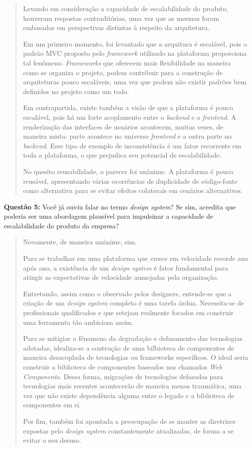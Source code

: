 \begin{quote}
    Levando em consideração a capacidade de escalabilidade do produto, houveram respostas contraditórias, uma vez que as mesmas foram embasadas em perspectivas distintas à respeito da arquitetura.
    
    Em um primeiro momento, foi levantado que a arquitura é escalável, pois o padrão MVC proposto pelo \textit{framework} utilizado na plataforma proporciona tal fenômeno. \textit{Frameworks} que oferecem mais flexibilidade na maneira como se organiza o projeto, podem contribuir para a construção de arquiteturas pouco escaláveis, uma vez que podem não existir padrões bem definidos no projeto como um todo.
    
    Em contrapartida, existe também a visão de que a plataforma é pouco escalável, pois há um forte acoplamento entre o \textit{backend} e o \textit{frontend}. A renderização das interfaces de usuários acontecem, muitas vezes, de maneira mista: parte acontece no universo \textit{frontend} e a outra parte no \textit{backend}. Esse tipo de exemplo de inconsistência é um fator recorrente em toda a plataforma, o que prejudica seu potencial de escalabilidade.
    
    No quesito reusabilidade, o parecer foi unânime. A plataforma é pouco reusável, apresentando várias ocorrências de duplicidade de código-fonte como alternativa para se evitar efeitos colaterais em cenários alternativos.
\end{quote}

\textbf{Questão 5:} Você já ouviu falar no termo \textit{design system}? Se sim, acredita que poderia ser uma abordagem plausível para impulsinar a capacidade de escalabilidade do produto da empresa?

\begin{quote}
    Novamente, de maneira unânime, sim.

    Para se trabalhar em uma plataforma que cresce em velocidade recorde ano após ano, a existência de um \textit{design system} é fator fundamental para atingir as expectativas de velocidade aumejadas pela organização.
    
    Entretando, assim como o observado pelos designers, entende-se que a criação de um \textit{design system} completo é uma tarefa árdua. Necessita-se de profissionais qualificados e que estejam realmente focados em construir uma ferramenta tão ambiciosa assim.
    
    Para se mitigiar o fênomeno da degradação e defasamento das tecnologias adotadas, idealiza-se a contrução de uma bilbioteca de componentes de maneira desacoplada de tecnologias ou frameworks específicos. O ideal seria construir a biblioteca de componentes baseados nos chamados \textit{Web Components}. Dessa forma, migrações de tecnologias defasadas para tecnologias mais recentes acontecerão de maneira menos traumática, uma vez que não existe dependência alguma entre o legado e a biblioteca de componentes em si.
    
    Por fim, também foi apontada a preocupação de se manter as diretrizes expostas pelo \textit{design system} constantemente atualizadas, de forma a se evitar o seu desuso.
\end{quote}

